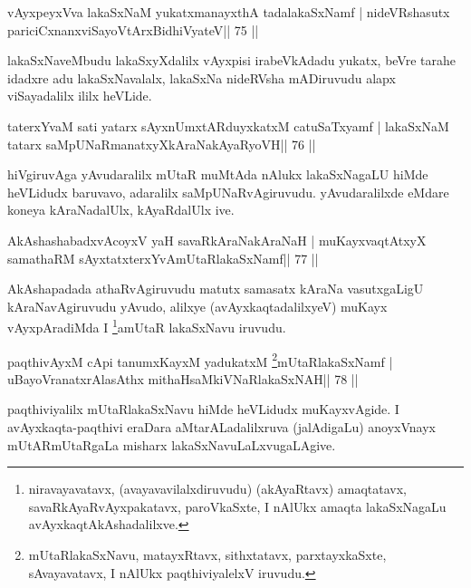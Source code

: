 \begin{shl}
vAyxpeyxVva lakaSxNaM yukatxmanayxthA tadalakaSxNamf |
nideVRshasutx pariciCxnanxviSayoV\s tArxBidhiVyateV\hfill || 75 ||
\end{shl}

\begin{artha}
lakaSxNaveMbudu lakaSxyXdalilx vAyxpisi irabeVkAdadu yukatx, beVre tarahe idadxre adu lakaSxNavalalx, lakaSxNa nideRVsha mADiruvudu alapx viSayadalilx ililx heVLide.
\end{artha}


\begin{shl}
taterxYvaM sati yatarx sAyxnUmxtARduyxkatxM catuSaTxyamf |
lakaSxNaM tatarx saMpUNaRmanatxyXkAraNakAyaRyoVH\hfill || 76 ||
\end{shl}

\begin{artha}
hiVgiruvAga yAvudaralilx mUtaR muMtAda nAlukx lakaSxNagaLU hiMde
heVLidudx baruvavo, adaralilx saMpUNaRvAgiruvudu. yAvudaralilxde
eMdare koneya kAraNadalUlx, kAyaRdalUlx ive. 
\end{artha}


\begin{shl}
AkAshashabadxvAcoyxV yaH savaRkAraNakAraNaH |
muKayxvaqtAtxyX samathaRM sAyxtatxterxYvAmUtaRlakaSxNamf\hfill || 77 ||
\end{shl}

\begin{artha}
AkAshapadada athaRvAgiruvudu matutx samasatx kAraNa vasutxgaLigU kAraNavAgiruvudu yAvudo, alilxye (avAyxkaqtadalilxyeV) muKayx vAyxpAradiMda I \footnote{niravayavatavx, (avayavavilalxdiruvudu) (akAyaRtavx) amaqtatavx, savaRkAyaRvAyxpakatavx, paroVkaSxte, I nAlUkx amaqta lakaSxNagaLu avAyxkaqtAkAshadalilxve.}amUtaR lakaSxNavu iruvudu.
\end{artha}




\begin{shl}
paqthivAyxM cApi tanumxKayxM yadukatxM \footnote{mUtaRlakaSxNavu, matayxRtavx, sithxtatavx, parxtayxkaSxte, sAvayavatavx, I nAlUkx paqthiviyalelxV iruvudu.}mUtaRlakaSxNamf |
uBayoVranatxrAlasAthx mithaHsaMkiVNaRlakaSxNAH\hfill || 78 ||
\end{shl}

\begin{artha}
paqthiviyalilx mUtaRlakaSxNavu hiMde heVLidudx muKayxvAgide. I avAyxkaqta-paqthivi eraDara aMtarALadalilxruva (jalAdigaLu) anoyxVnayx mUtARmUtaRgaLa misharx lakaSxNavuLaLxvugaLAgive.
\end{artha}

